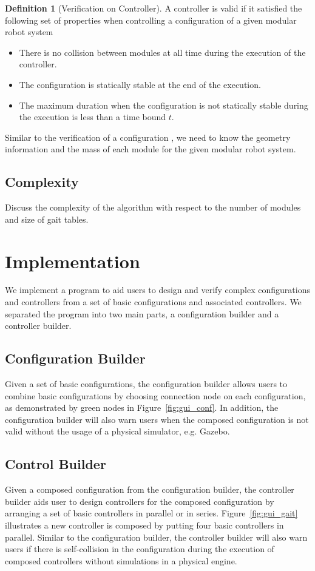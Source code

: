 \documentclass[conference]{IEEEtran}
\theoremstyle{definition}
\newtheorem{definition}{Definition}[section]
\begin{document}
\begin{definition}[Verification on Controller]
A controller is valid if it satisfied the following set of properties when controlling a configuration of a given modular robot system
\begin{itemize}
\item There is no collision between modules at all time during the execution of the controller.
\item The configuration is statically stable at the end of the execution.
\item The maximum duration when the configuration is not statically stable during the execution is less than a time bound $t$.
\end{itemize}
Similar to the verification of a configuration , we need to know the geometry information and the mass of each module for the given modular robot system.
\end{definition}



\subsection{Complexity}
Discuss the complexity of the algorithm with respect to the number of modules and size of gait tables.

\section{Implementation }
\label{sec:example}
We implement a program to aid users to design and verify complex configurations and controllers from a set of basic configurations and associated controllers. We separated the program into two main parts, a configuration builder and a controller builder.

\subsection{Configuration Builder}
Given a set of basic configurations, the configuration builder allows users to combine basic configurations by choosing connection node on each configuration, as demonstrated by green nodes in Figure~\ref{fig:gui_conf}. In addition, the configuration builder will also warn users when the composed configuration is not valid without the usage of a physical simulator, e.g. Gazebo.

\subsection{Control Builder}
Given a composed configuration from the configuration builder, the controller builder aids user to design controllers for the composed configuration by arranging a set of basic controllers in parallel or in series. Figure~\ref{fig:gui_gait} illustrates a new controller is composed by putting four basic controllers in parallel. Similar to the configuration builder, the controller builder will also warn users if there is self-collision in the configuration during the execution of composed controllers without simulations in a physical engine.
\end{document}
